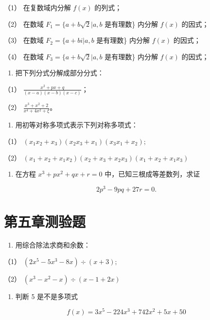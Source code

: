 （1） 在复数域内分解 \(f(x)\) 的列式；

（2） 在数域 \(F_{1} = \{a + b\sqrt{2} | a, b\) 是有理数\} 内分解
\(f(x)\) 的因式；

（3） 在数域 \(F_{2} = \{a + bi | a, b\) 是有理数\} 内分解 \(f(x)\)
的因式；

（4） 在数域 \(F_{3} = \{a + b\sqrt{2} | a, b\) 是有理数\} 内分解
\(f(x)\) 的因式；

\begin{enumerate}[start=18]
\item
  把下列分式分解成部分分式：
\end{enumerate}

（1） \(\frac{x^2 + px + q}{(x - a)(x - b)(x - c)}\)；

（2） \(\frac{x^3 + x^2 + 2}{x^4 + 4x^2 + \xi}\)。

\begin{enumerate}[start=19]
\item
  用初等对称多项式表示下列对称多项式：
\end{enumerate}

（1） \((x_{1}x_{2} + x_{3})(x_{2}x_{3} + x_{1})(x_{3}x_{1} + x_{2});\)

（2）
\((x_{1} + x_{2} + x_{1}x_{2})(x_{2} + x_{3} + x_{2}x_{3})(x_{1} + x_{2} + x_{1}x_{3})\)

\begin{enumerate}[start=20]
\item
  在方程 \(x^{3} + px^{2} + qx + r = 0\) 中，已知三根成等差数列，求证
\end{enumerate}

\[
2 p ^ {3} - 9 p q + 27 r = 0.
\]

\section{第五章测验题}

\begin{enumerate}
\item
  用综合除法求商和余数：
\end{enumerate}

（1） \((2x^{5} - 5x^{3} - 8x)\div (x + 3);\)

（2） \((x^{3} - x^{2} - x)\div (x - 1 + 2x)\)

\begin{enumerate}[start=2]
\item
  判断 5 是不是多项式
\end{enumerate}

\[
f (x) = 3 x ^ {5} - 224 x ^ {3} + 742 x ^ {2} + 5 x + 50
\]

